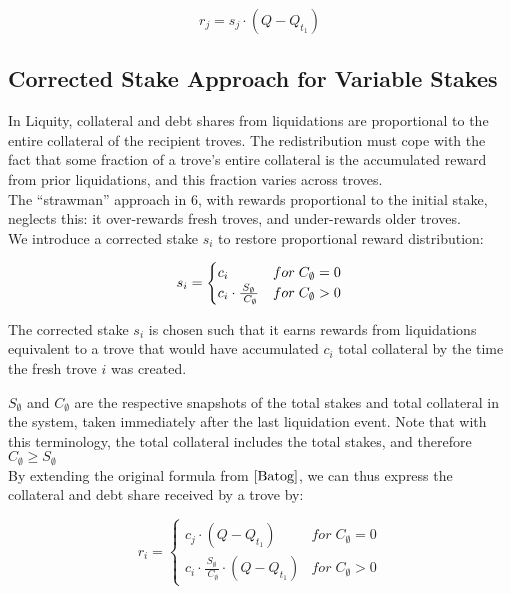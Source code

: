 \documentclass[reqno]{article}
\begin{document}
\begin{equation} 
    r_j = s_j \cdot (Q - Q_{t_1})
\end{equation}

\bigskip

\subsection{Corrected Stake Approach for Variable Stakes}
In Liquity, collateral and debt shares from liquidations are proportional to the entire collateral of the recipient troves. The redistribution must cope with the fact that some fraction of a trove's entire collateral is the accumulated reward from prior liquidations, and this fraction varies across troves. \\

The “strawman” approach in 6, with rewards proportional to the initial stake, neglects this: it over-rewards fresh troves, and under-rewards older troves. \\

We introduce a corrected stake $s_i$ to restore proportional reward distribution:

\begin{equation} \label{eq:2}
    s_i=
        \begin{cases} 
            c_i & for \;C_\emptyset = 0\\
            \mathlarger{c_i} \cdot \frac{S_\emptyset} {\;C_\emptyset} & for \;C_\emptyset>0
        \end{cases}
\end{equation}

\bigskip
The corrected stake $s_i$ is chosen such that it earns rewards from liquidations equivalent to a trove that would have accumulated $c_i$ total collateral by the time the fresh trove $i$ was created.
 
$S_\emptyset$ and $C_\emptyset$ are the respective snapshots of the total stakes and total collateral in the system, taken immediately after the last liquidation event. Note that with this terminology, the total collateral includes the total stakes, and therefore $C_\emptyset \ge S_\emptyset$
\\

By extending the original formula from $\cite{Batog}$, we can thus express the collateral and debt share received by a trove by:

\begin{equation}
    r_i=
        \begin{cases} 
            c_j \cdot (Q - Q_{t_1}) & for \;C_\emptyset = 0\\
            c_i \cdot \frac{S_\emptyset} {\;C_\emptyset} \cdot (Q - Q_{t_1}) & for \;C_\emptyset>0
        \end{cases}
\end{equation}
\end{document}
